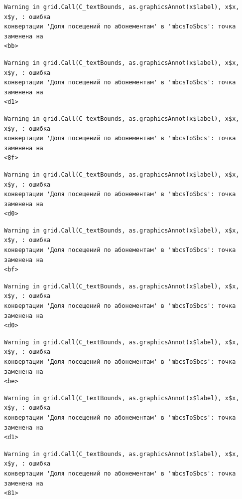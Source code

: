 \documentclass[
  letterpaper,
  DIV=11,
  numbers=noendperiod]{scrreprt}
\begin{document}
\begin{verbatim}
Warning in grid.Call(C_textBounds, as.graphicsAnnot(x$label), x$x, x$y, : ошибка
конвертации 'Доля посещений по абонементам' в 'mbcsToSbcs': точка заменена на
<bb>
\end{verbatim}

\begin{verbatim}
Warning in grid.Call(C_textBounds, as.graphicsAnnot(x$label), x$x, x$y, : ошибка
конвертации 'Доля посещений по абонементам' в 'mbcsToSbcs': точка заменена на
<d1>
\end{verbatim}

\begin{verbatim}
Warning in grid.Call(C_textBounds, as.graphicsAnnot(x$label), x$x, x$y, : ошибка
конвертации 'Доля посещений по абонементам' в 'mbcsToSbcs': точка заменена на
<8f>
\end{verbatim}

\begin{verbatim}
Warning in grid.Call(C_textBounds, as.graphicsAnnot(x$label), x$x, x$y, : ошибка
конвертации 'Доля посещений по абонементам' в 'mbcsToSbcs': точка заменена на
<d0>
\end{verbatim}

\begin{verbatim}
Warning in grid.Call(C_textBounds, as.graphicsAnnot(x$label), x$x, x$y, : ошибка
конвертации 'Доля посещений по абонементам' в 'mbcsToSbcs': точка заменена на
<bf>
\end{verbatim}

\begin{verbatim}
Warning in grid.Call(C_textBounds, as.graphicsAnnot(x$label), x$x, x$y, : ошибка
конвертации 'Доля посещений по абонементам' в 'mbcsToSbcs': точка заменена на
<d0>
\end{verbatim}

\begin{verbatim}
Warning in grid.Call(C_textBounds, as.graphicsAnnot(x$label), x$x, x$y, : ошибка
конвертации 'Доля посещений по абонементам' в 'mbcsToSbcs': точка заменена на
<be>
\end{verbatim}

\begin{verbatim}
Warning in grid.Call(C_textBounds, as.graphicsAnnot(x$label), x$x, x$y, : ошибка
конвертации 'Доля посещений по абонементам' в 'mbcsToSbcs': точка заменена на
<d1>
\end{verbatim}

\begin{verbatim}
Warning in grid.Call(C_textBounds, as.graphicsAnnot(x$label), x$x, x$y, : ошибка
конвертации 'Доля посещений по абонементам' в 'mbcsToSbcs': точка заменена на
<81>
\end{verbatim}
\end{document}
